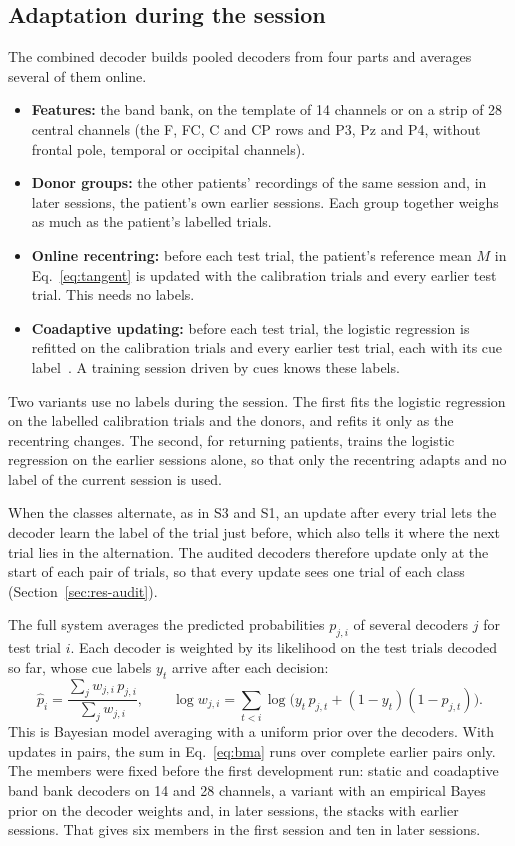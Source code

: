 \documentclass[pdflatex,sn-mathphys-num]{sn-jnl}
\begin{document}
\subsection{Adaptation during the session}\label{sec:adapt}

The combined decoder builds pooled decoders from four parts and averages several of them online.
\begin{itemize}
\item \textbf{Features:} the band bank, on the template of 14 channels or on a strip of 28 central channels (the F, FC, C and CP rows and P3, Pz and P4, without frontal pole, temporal or occipital channels).
\item \textbf{Donor groups:} the other patients' recordings of the same session and, in later sessions, the patient's own earlier sessions. Each group together weighs as much as the patient's labelled trials.
\item \textbf{Online recentring:} before each test trial, the patient's reference mean $M$ in Eq.~\eqref{eq:tangent} is updated with the calibration trials and every earlier test trial. This needs no labels.
\item \textbf{Coadaptive updating:} before each test trial, the logistic regression is refitted on the calibration trials and every earlier test trial, each with its cue label~\cite{vidaurre2011}. A training session driven by cues knows these labels.
\end{itemize}
Two variants use no labels during the session. The first fits the logistic regression on the labelled calibration trials and the donors, and refits it only as the recentring changes. The second, for returning patients, trains the logistic regression on the earlier sessions alone, so that only the recentring adapts and no label of the current session is used.

When the classes alternate, as in S3 and S1, an update after every trial lets the decoder learn the label of the trial just before, which also tells it where the next trial lies in the alternation. The audited decoders therefore update only at the start of each pair of trials, so that every update sees one trial of each class (Section~\ref{sec:res-audit}).

The full system averages the predicted probabilities $p_{j,i}$ of several decoders $j$ for test trial $i$. Each decoder is weighted by its likelihood on the test trials decoded so far, whose cue labels $y_t$ arrive after each decision:
\begin{equation}
\hat p_i = \frac{\sum_j w_{j,i}\, p_{j,i}}{\sum_j w_{j,i}}, \qquad \log w_{j,i} = \sum_{t < i} \log\bigl(y_t\, p_{j,t} + (1 - y_t)(1 - p_{j,t})\bigr).\label{eq:bma}
\end{equation}
This is Bayesian model averaging with a uniform prior over the decoders. With updates in pairs, the sum in Eq.~\eqref{eq:bma} runs over complete earlier pairs only. The members were fixed before the first development run: static and coadaptive band bank decoders on 14 and 28 channels, a variant with an empirical Bayes prior on the decoder weights and, in later sessions, the stacks with earlier sessions. That gives six members in the first session and ten in later sessions.
\end{document}
